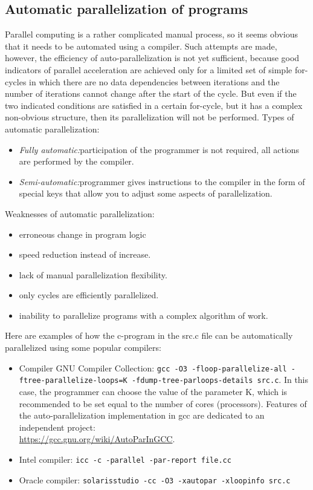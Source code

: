 { %
	\subsection{Automatic parallelization of programs}
	\par Parallel computing is a rather complicated manual process, so it seems obvious that it needs to be automated using a compiler. Such attempts are made, however, the efficiency of auto-parallelization is not yet sufficient, because good indicators of parallel acceleration are achieved only for a limited set of simple for-cycles in which there are no data dependencies between iterations and the number of iterations cannot change after the start of the cycle. But even if the two indicated conditions are satisfied in a certain for-cycle, but it has a complex non-obvious structure, then its parallelization will not be performed. Types of automatic parallelization:
	\begin{itemize}
		\item\textit{Fully automatic:}\quad participation of the programmer is not required, all actions are performed by the compiler.
		\item\textit{Semi-automatic:}\quad programmer gives instructions to the compiler in the form of special keys that allow you to adjust some aspects of parallelization.
	\end{itemize}
	\par Weaknesses of automatic parallelization:
	\begin{itemize}
		\item erroneous change in program logic
		\item speed reduction instead of increase.
		\item lack of manual parallelization flexibility.
		\item only cycles are efficiently parallelized.
		\item inability to parallelize programs with a complex algorithm of work.
	\end{itemize}
	\par Here are examples of how the c-program in the src.c file can be automatically parallelized using some popular compilers:
	\begin{itemize}
		\item Compiler GNU Compiler Collection:	 
\texttt{gcc -O3 -floop-parallelize-all -ftree-parallelize-loops=K -fdump-tree-parloops-details src.c}. In this case, the programmer can choose the value of the parameter K, which is recommended to be set equal to the number of cores (processors). Features of the auto-parallelization implementation in gcc are dedicated to an independent project:\\ \url{https://gcc.gnu.org/wiki/AutoParInGCC}. 
		\item Intel compiler:	 
\texttt{icc -c -parallel -par-report file.cc}
		\item Oracle compiler:	 
\texttt{solarisstudio -cc -O3 -xautopar -xloopinfo src.c}
	\end{itemize}
}